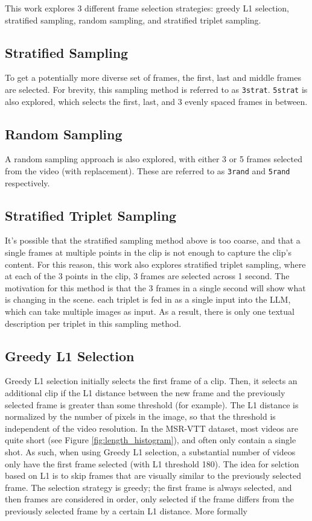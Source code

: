 This work explores 3 different frame selection strategies:
greedy L1 selection, stratified sampling, random sampling, and stratified triplet sampling.

\subsection{Stratified Sampling}
To get a potentially more diverse set of frames, the first, last and middle frames are selected.
For brevity, this sampling method is referred to as \verb|3strat|. \verb|5strat| is also explored, which selects the first, last, and 3 evenly spaced frames in between.

\subsection{Random Sampling}
A random sampling approach is also explored, with either 3 or 5 frames selected from the video (with replacement).
These are referred to as \verb|3rand| and \verb|5rand| respectively.

\subsection{Stratified Triplet Sampling}
It's possible that the stratified sampling method above is too coarse, and that a single frames at multiple points in the clip is not enough to capture the clip's content.
For this reason, this work also explores stratified triplet sampling, where at each of the 3 points in the clip, 3 frames are selected across 1 second.
The motivation for this method is that the 3 frames in a single second will show what is changing in the scene.
each triplet is fed in as a single input into the LLM, which can take multiple images as input.
As a result, there is only one textual description per triplet in this sampling method.

\subsection{Greedy L1 Selection}
Greedy L1 selection initially selects the first frame of a clip. Then, it selects an additional clip if the L1 distance between the new frame and the previously selected frame is greater than some threshold (for example).
The L1 distance is normalized by the number of pixels in the image, so that the threshold is independent of the video resolution.
In the MSR-VTT dataset, most videos are quite short (see Figure \ref{fig:length_histogram}), and often only contain a single shot.
As such, when using Greedy L1 selection, a substantial number of videos only have the first frame selected (with L1 threshold 180).
The idea for selction based on L1 is to skip frames that are visually similar to the previously selected frame.
The selection strategy is greedy; the first frame is always selected, and then frames are considered in order, only selected if the frame differs from the previously selected frame by a certain L1 distance.
More formally

